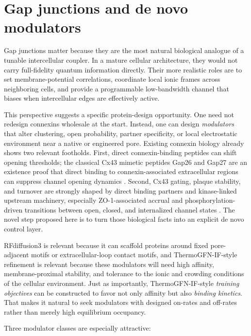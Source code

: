 \documentclass[11pt]{report}
\theoremstyle{definition}
\begin{document}
\section{Gap junctions and de novo modulators}
Gap junctions matter because they are the most natural biological analogue of a tunable intercellular coupler. In a mature cellular architecture, they would not carry full-fidelity quantum information directly. Their more realistic roles are to set membrane-potential correlations, coordinate local ionic frames across neighboring cells, and provide a programmable low-bandwidth channel that biases when intercellular edges are effectively active.

This perspective suggests a specific protein-design opportunity. One need not redesign connexins wholesale at the start. Instead, one can design \emph{modulators} that alter clustering, open probability, partner specificity, or local electrostatic environment near a native or engineered pore. Existing connexin biology already shows two relevant footholds. First, direct connexin-binding peptides can shift opening thresholds; the classical Cx43 mimetic peptides Gap26 and Gap27 are an existence proof that direct binding to connexin-associated extracellular regions can suppress channel opening dynamics \cite{desplantez2012}. Second, Cx43 gating, plaque stability, and turnover are strongly shaped by direct binding partners and kinase-linked upstream machinery, especially ZO-1-associated accrual and phosphorylation-driven transitions between open, closed, and internalized channel states \cite{thevenin2017}. The novel step proposed here is to turn those biological facts into an explicit de novo control layer.

RFdiffusion3 is relevant because it can scaffold proteins around fixed pore-adjacent motifs or extracellular-loop contact motifs, and ThermoGFN-IF-style refinement is relevant because these modulators will need high affinity, membrane-proximal stability, and tolerance to the ionic and crowding conditions of the cellular environment. Just as importantly, ThermoGFN-IF-style \emph{training objectives} can be constructed to favor not only affinity but also \emph{binding kinetics}. That makes it natural to seek modulators with designed on-rates and off-rates rather than merely high equilibrium occupancy.

Three modulator classes are especially attractive:
\end{document}
